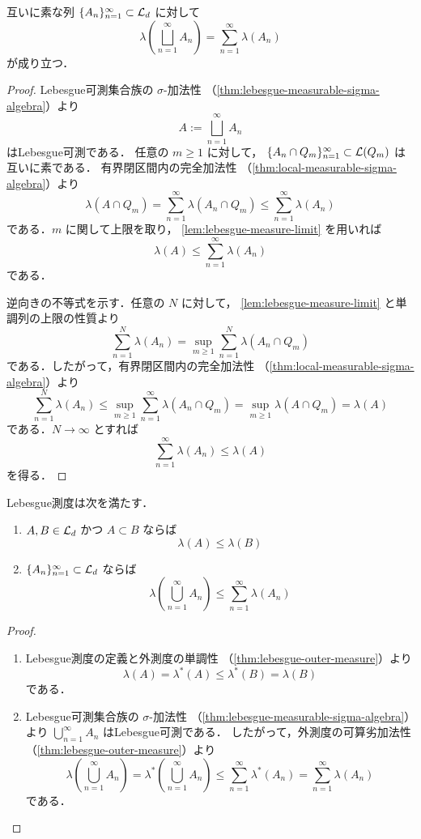 \begin{theorem}[完全加法性]\label{thm:lebesgue-measure-countable-additivity}
互いに素な列 $\{A_n\}_{n=1}^{\infty}\subset\mathcal L_d$ に対して
\[
\lambda\left(\bigsqcup_{n=1}^{\infty}A_n\right)
=
\sum_{n=1}^{\infty}\lambda(A_n)
\]
が成り立つ．
\end{theorem}
\begin{proof}
Lebesgue可測集合族の $\sigma$-加法性
（\cref{thm:lebesgue-measurable-sigma-algebra}）より
\[
A:=\bigsqcup_{n=1}^{\infty}A_n
\]
はLebesgue可測である．
任意の $m\ge1$ に対して，
$\{A_n\cap Q_m\}_{n=1}^{\infty}\subset\mathcal L(Q_m)$ は互いに素である．
有界閉区間内の完全加法性
（\cref{thm:local-measurable-sigma-algebra}）より
\[
\lambda(A\cap Q_m)
=
\sum_{n=1}^{\infty}\lambda(A_n\cap Q_m)
\le
\sum_{n=1}^{\infty}\lambda(A_n)
\]
である．$m$ に関して上限を取り，
\cref{lem:lebesgue-measure-limit} を用いれば
\[
\lambda(A)\le\sum_{n=1}^{\infty}\lambda(A_n)
\]
である．

逆向きの不等式を示す．任意の $N$ に対して，
\cref{lem:lebesgue-measure-limit} と単調列の上限の性質より
\[
\sum_{n=1}^{N}\lambda(A_n)
=
\sup_{m\ge1}\sum_{n=1}^{N}\lambda(A_n\cap Q_m)
\]
である．したがって，有界閉区間内の完全加法性
（\cref{thm:local-measurable-sigma-algebra}）より
\[
\sum_{n=1}^{N}\lambda(A_n)
\le
\sup_{m\ge1}\sum_{n=1}^{\infty}\lambda(A_n\cap Q_m)
=
\sup_{m\ge1}\lambda(A\cap Q_m)
=
\lambda(A)
\]
である．$N\to\infty$ とすれば
\[
\sum_{n=1}^{\infty}\lambda(A_n)\le\lambda(A)
\]
を得る．
\end{proof}

\begin{theorem}[単調性と劣加法性]\label{thm:lebesgue-measure-basic}
Lebesgue測度は次を満たす．
\begin{enumerate}
    \item $A,B\in\mathcal L_d$ かつ $A\subset B$ ならば
    \[
    \lambda(A)\le\lambda(B)
    \]
    \item $\{A_n\}_{n=1}^{\infty}\subset\mathcal L_d$ ならば
    \[
    \lambda\left(\bigcup_{n=1}^{\infty}A_n\right)
    \le
    \sum_{n=1}^{\infty}\lambda(A_n)
    \]
\end{enumerate}
\end{theorem}
\begin{proof}
\begin{enumerate}
    \item Lebesgue測度の定義と外測度の単調性
    （\cref{thm:lebesgue-outer-measure}）より
    \[
    \lambda(A)=\lambda^*(A)\le\lambda^*(B)=\lambda(B)
    \]
    である．

    \item Lebesgue可測集合族の $\sigma$-加法性
    （\cref{thm:lebesgue-measurable-sigma-algebra}）より
    $\bigcup_{n=1}^{\infty}A_n$ はLebesgue可測である．
    したがって，外測度の可算劣加法性
    （\cref{thm:lebesgue-outer-measure}）より
    \[
    \lambda\left(\bigcup_{n=1}^{\infty}A_n\right)
    =
    \lambda^*\left(\bigcup_{n=1}^{\infty}A_n\right)
    \le
    \sum_{n=1}^{\infty}\lambda^*(A_n)
    =
    \sum_{n=1}^{\infty}\lambda(A_n)
    \]
    である．
\end{enumerate}
\end{proof}


